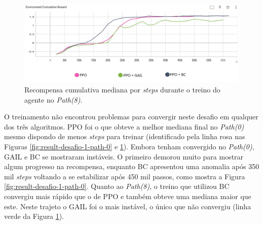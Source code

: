 \begin{figure}[h]
    \centering
    \includegraphics[scale=0.42]{figs/treinos/desafio-mediano/path8/recompensa-ppo-bc-gail-path8.png}
    \caption{Recompensa cumulativa mediana por \textit{steps} durante o treino do agente no \textit{Path(8)}.}
    \label{fig:result-desafio-1-path-8}
\end{figure}

O treinamento não encontrou problemas para convergir neste desafio em qualquer dos três algoritmos. PPO foi o que obteve a melhor mediana final no \textit{Path(0)} mesmo dispondo de menos \textit{steps} para treinar (identificado pela linha rosa nas Figuras \ref{fig:result-desafio-1-path-0} e \ref{fig:result-desafio-1-path-8}). Embora tenham convergido no \textit{Path(0)}, GAIL e BC se mostraram instáveis. O primeiro demorou muito para mostrar algum progresso na recompensa, enquanto BC apresentou uma anomalia após 350 mil \textit{steps} voltando a se estabilizar após 450 mil passos, como mostra a Figura \ref{fig:result-desafio-1-path-0}. Quanto ao \textit{Path(8)}, o treino que utilizou BC convergiu mais rápido que o de PPO e também obteve uma mediana maior que este. Neste trajeto o GAIL foi o mais instável, o único que não convergiu (linha verde da Figura \ref{fig:result-desafio-1-path-8}).


